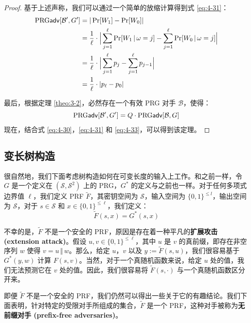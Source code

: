 \begin{proof}
基于上述声称，我们可以通过一个简单的放缩计算得到式 \ref{eq:4-31}：
\[
\begin{aligned}
{\rm PRG\mathsf{adv}}[\mathcal{B}',G']
&=|\Pr[W_1]-\Pr[W_0]|\\
&=\frac{1}{\ell}\cdot\Big\lvert\sum_{j=1}^\ell\Pr[W_1\,|\,\omega=j]-\sum_{j=1}^\ell\Pr[W_0\,|\,\omega=j]\Big\rvert\\
&=\frac{1}{\ell}\cdot\Big\lvert\sum_{j=1}^\ell p_j-\sum_{j=1}^\ell p_{j-1}\Big\rvert\\
&=\frac{1}{\ell}\cdot|p_\ell-p_0|
\end{aligned}
\]

最后，根据定理 \ref{theo:3-2}，必然存在一个有效 PRG 对手 $\mathcal{B}$，使得：
\begin{equation}\label{eq:4-33}
{\rm PRG\mathsf{adv}}[\mathcal{B}',G']=Q\cdot{\rm PRG\mathsf{adv}}[\mathcal{B},G]
\end{equation}
现在，结合式 \ref{eq:4-30}，\ref{eq:4-31} 和 \ref{eq:4-33}，可以得到该定理。
\end{proof}

\subsection{变长树构造}

很自然地，我们下面考虑树构造如何在可变长度的输入上工作。和之前一样，令 $G$ 是一个定义在 $(\mathcal{S},\mathcal{S}^2)$ 上的 PRG，$G^*$ 的定义与之前也一样。对于任何多项式边界值 $\ell$，我们定义 PRF $\tilde F$，其密钥空间为 $\mathcal{S}$，输入空间为 $\{0,1\}^{\leq l}$，输出空间为 $\mathcal{S}$，对于 $s\in\mathcal{S}$ 和 $x\in\{0,1\}^{\leq\ell}$，我们定义：
\[
\tilde F(s,x)=G^*(s,x)
\]

不幸的是，$\tilde F$ 不是一个安全的 PRF，原因是存在着一种平凡的\textbf{扩展攻击 (extension attack)}。假设 $u,v\in\{0,1\}^{\leq\ell}$，其中 $u$ 是 $v$ 的真前缀，即存在非空序列 $w$ 使得 $v=u\,\Vert\,w$。那么，给定 $u$，$v$ 以及 $y:=\tilde F(s,u)$，我们很容易基于 $G^*(y,w)$ 计算 $F(s,v)$。当然，对于一个真随机函数来说，给定 $u$ 处的值，我们无法预测它在 $v$ 处的值。因此，我们很容易将 $\tilde F(s,\cdot)$ 与一个真随机函数区分开来。

即便 $\tilde F$ 不是一个安全的 PRF，我们仍然可以得出一些关于它的有趣结论。我们下面表明，针对特定的受限对手所组成的集合，$\tilde F$ 是一个 PRF，这种对手被称为\textbf{无前缀对手 (prefix-free adversaries)}。

